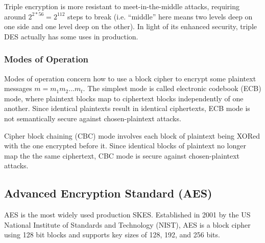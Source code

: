 \documentclass[12pt,titlepage]{article}
\begin{document}
        Triple encryption is more resistant to meet-in-the-middle attacks, requiring around $2^{2*56} = 2^{112}$ steps to break (i.e. ``middle'' here means two levels
        deep on one side and one level deep on the other). In light of its enhanced security, triple DES actually has some uses in production.

      \subsubsection{Modes of Operation}
        Modes of operation concern how to use a block cipher to encrypt some plaintext messages $m = m_1 m_2 . . . m_t$. The simplest mode is called electronic codebook
        (ECB) mode, where plaintext blocks map to ciphertext blocks independently of one another. Since identical plaintexts result in identical ciphertexts, ECB mode
        is not semantically secure against chosen-plaintext attacks.

        Cipher block chaining (CBC) mode involves each block of plaintext being XORed with the one encrypted before it. Since identical blocks of plaintext no longer map
        the the same ciphertext, CBC mode is secure against chosen-plaintext attacks.

    \subsection{Advanced Encryption Standard (AES)}
      AES is the most widely used production SKES. Established in 2001 by the US National Institute of Standards and Technology (NIST), AES is a block cipher using 128 bit
      blocks and supports key sizes of 128, 192, and 256 bits.
\end{document}
